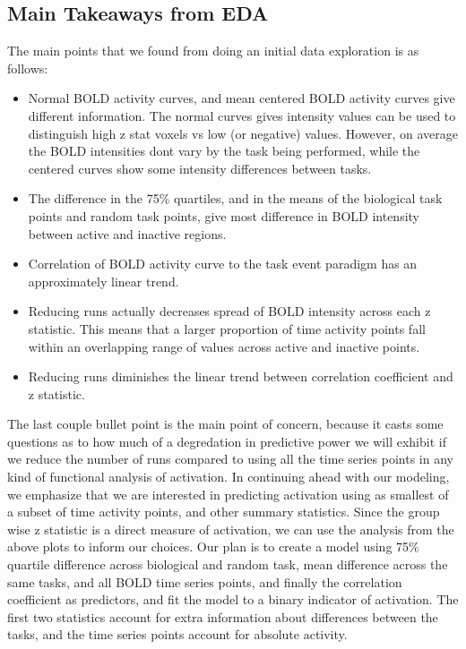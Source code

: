 \documentclass{report}
\begin{document}
\subsection{Main Takeaways from EDA}
The main points that we found from doing an initial data exploration is as follows:
\begin{itemize}
\item Normal BOLD activity curves, and mean centered BOLD activity curves give different information. The normal curves gives intensity values can be used to distinguish high z stat voxels vs low (or negative) values. However, on average the BOLD intensities dont vary by the task being performed, while the centered curves show some intensity differences between tasks.
\item The difference in the 75\% quartiles, and in the means of the biological task points and random task points, give most difference in BOLD intensity between active and inactive regions.
\item Correlation of BOLD activity curve to the task event paradigm has an approximately linear trend.
\item Reducing runs actually decreases spread of BOLD intensity across each z statistic. This means that a larger proportion of time activity points fall within an overlapping range of values across active and inactive points.
\item Reducing runs diminishes the linear trend between correlation coefficient and z statistic. 
\end{itemize}
The last couple bullet point is the main point of concern, because it casts some questions as to how much of a degredation in predictive power we will exhibit if we reduce the number of runs compared to using all the time series points in any kind of functional analysis of activation.
In continuing ahead with our modeling, we emphasize that we are interested in predicting activation using as smallest of a subset of time activity points, and other summary statistics. Since the group wise z statistic is a direct measure of activation, we can use the analysis from the above plots to inform our choices. Our plan is to create a model using 75\% quartile difference across biological and random task, mean difference
across the same tasks, and all BOLD time series points, and finally the correlation coefficient as predictors, and fit the model to a binary indicator of activation. The first two statistics account for extra information about differences between the tasks, and the time series points account for absolute activity.
\end{document}
